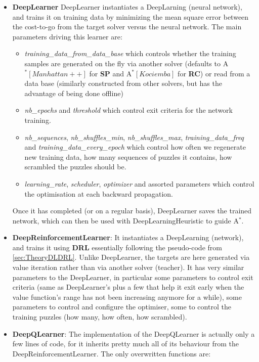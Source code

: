 \begin{itemize}
\item \textbf{DeepLearner} DeepLearner instantiates a DeepLarning (neural network), and trains it on training data by minimizing the mean square error between the cost-to-go from the target solver versus the neural network. The main parameters driving this learner are:
\begin{itemize}
\item \textit{training\_data\_from\_data\_base} which controls whether the training samples are generated on the fly via another solver (defaults to A$^{*}[Manhattan++]$ for \textbf{SP} and A$^{*}[Kociemba]$ for \textbf{RC}) or read from a data base (similarly constructed from other solvers, but has the advantage of being done offline)
\item \textit{nb\_epochs} and \textit{threshold} which control exit criteria for the network training.
\item \textit{nb\_sequences}, \textit{nb\_shuffles\_min}, \textit{nb\_shuffles\_max}, \textit{training\_data\_freq} and \textit{training\_data\_every\_epoch} which control how often we regenerate new training data, how many sequences of puzzles it contains, how scrambled the puzzles should be.
\item \textit{learning\_rate}, \textit{scheduler}, \textit{optimizer} and assorted parameters which control the optimisation at each backward propagation. 
\end{itemize}
Once it has completed (or on a regular basis), DeepLearner saves the trained network, which can then be used with DeepLearningHeuristic to guide A$^{*}$.
\item \textbf{DeepReinforcementLearner}: It instantiates a DeepLearning (network), and trains it using \textbf{DRL} essentially following the pseudo-code from \ref{sec:TheoryDLDRL}. Unlike DeepLearner, the targets are here generated via value iteration rather than via another solver (teacher). It has very similar parameters to the DeepLearner, in particular some parameters to control exit criteria (same as DeepLearner's plus a few that help it exit early when the value function's range has not been increasing anymore for a while), some parameters to control and configure the optimiser, some to control the training puzzles (how many, how often, how scrambled).



\item \textbf{DeepQLearner}: The implementation of the DeepQLearner is actually only a few lines of code, for it inherits pretty much all of its behaviour from the DeepReinforcementLearner. The only overwritten functions are:


\end{itemize}

